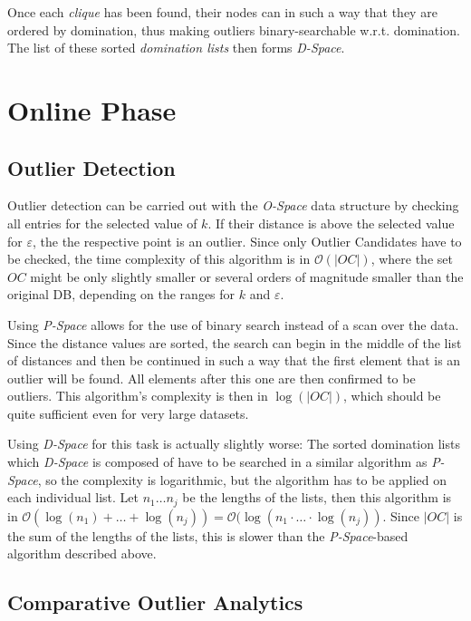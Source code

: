\documentclass[runningheads]{llncs}
\begin{document}
Once each \emph{clique} has been found, their nodes can in such a way that they are ordered by domination, thus making outliers binary-searchable w.r.t. domination. The list of these sorted \emph{domination lists} then forms \emph{D-Space}.

\section{Online Phase}
\subsection{Outlier Detection}

Outlier detection can be carried out with the \emph{O-Space} data structure by checking all entries for the selected value of $k$. If their distance is above the selected value for $\varepsilon$, the the respective point is an outlier. Since only Outlier Candidates have to be checked, the time complexity of this algorithm is in $\mathcal{O}(|OC|)$, where the set $OC$ might be only slightly smaller or several orders of magnitude smaller than the original DB, depending on the ranges for $k$ and $\varepsilon$.

Using \emph{P-Space} allows for the use of binary search instead of a scan over the data. Since the distance values are sorted, the search can begin in the middle of the list of distances and then be continued in such a way that the first element that is an outlier will be found. All elements after this one are then confirmed to be outliers. This algorithm's complexity is then in $\log(|OC|)$, which should be quite sufficient even for very large datasets.

Using \emph{D-Space} for this task is actually slightly worse: The sorted domination lists which \emph{D-Space} is composed of have to be searched in a similar algorithm as \emph{P-Space}, so the complexity is logarithmic, but the algorithm has to be applied on each individual list. Let $n_1 \ldots n_j$ be the lengths of the lists, then this algorithm is in $\mathcal{O}(\log(n_1) + \ldots + \log(n_j)) = \mathcal{O}(\log(n_1 \cdot \ldots \cdot \log(n_j))$. Since $|OC|$ is the sum of the lengths of the lists, this is slower than the \emph{P-Space}-based algorithm described above.
\subsection{Comparative Outlier Analytics}
\end{document}
